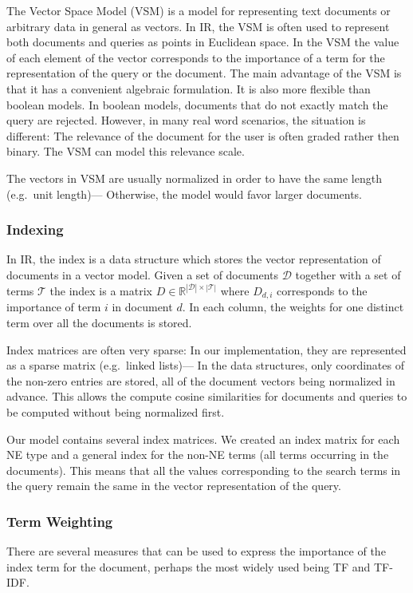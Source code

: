
The Vector Space Model (VSM) is a model for representing text documents or arbitrary data in general as vectors. In IR, the VSM is often used to represent both documents and queries as points in Euclidean space. In the VSM the value of each element of the vector corresponds to the importance of a term for the representation of the query or the document. The main advantage of the VSM is that it has a convenient algebraic formulation. It is also more flexible than boolean models. In boolean models, documents that do not exactly match the query are rejected. However, in many real word scenarios, the situation is different: The relevance of the document for the user is often graded rather then binary. The VSM can model this relevance scale.

The vectors in VSM are usually normalized in order to have the same length (e.g.\ unit length)--- Otherwise, the model would favor larger documents.

\subsubsection{Indexing}
\label{sec:indexing}
In IR, the index is a data structure which stores the vector representation of documents in a vector model. Given a set of documents $\mathcal{D}$ together with a set of terms $\mathcal{T}$ the index is a matrix $D \in \mathbb{R}^{|\mathcal{D}|\times |\mathcal{T}|}$ where $D_{d,i}$ corresponds to the importance of term $i$ in document $d$. In each column, the weights for one distinct term over all the documents is stored.

Index matrices are often very sparse: In our implementation, they are represented as a sparse matrix (e.g.\ linked lists)--- In the data structures, only coordinates of the non-zero entries are stored, all of the document vectors being normalized in advance. This allows the compute cosine similarities for documents and queries to be computed without being normalized first.

Our model contains several index matrices. We created an index matrix for each NE type and a general index for the non-NE terms (all terms occurring in the documents). This means that all the values corresponding to the search terms in the query remain the same in the vector representation of the query.

\subsubsection{Term Weighting}
\label{sec:term_weighting}
There are several measures that can be used to express the importance of the index term for the document, perhaps the most widely used being TF and TF-IDF.

